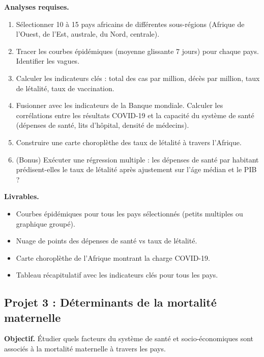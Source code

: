 \textbf{Analyses requises.}
\begin{enumerate}
  \item S\'electionner 10 \`a 15 pays africains de diff\'erentes sous-r\'egions (Afrique de l'Ouest, de l'Est, australe, du Nord, centrale).
  \item Tracer les courbes \'epid\'emiques (moyenne glissante 7 jours) pour chaque pays. Identifier les vagues.
  \item Calculer les indicateurs cl\'es : total des cas par million, d\'ec\`es par million, taux de l\'etalit\'e, taux de vaccination.
  \item Fusionner avec les indicateurs de la Banque mondiale. Calculer les corr\'elations entre les r\'esultats COVID-19 et la capacit\'e du syst\`eme de sant\'e (d\'epenses de sant\'e, lits d'h\^opital, densit\'e de m\'edecins).
  \item Construire une carte choropl\`ethe des taux de l\'etalit\'e \`a travers l'Afrique.
  \item (Bonus) Ex\'ecuter une r\'egression multiple : les d\'epenses de sant\'e par habitant pr\'edisent-elles le taux de l\'etalit\'e apr\`es ajustement sur l'\'age m\'edian et le PIB ?
\end{enumerate}

\textbf{Livrables.}
\begin{itemize}
  \item Courbes \'epid\'emiques pour tous les pays s\'electionn\'es (petits multiples ou graphique group\'e).
  \item Nuage de points des d\'epenses de sant\'e vs taux de l\'etalit\'e.
  \item Carte choropl\`ethe de l'Afrique montrant la charge COVID-19.
  \item Tableau r\'ecapitulatif avec les indicateurs cl\'es pour tous les pays.
\end{itemize}

\subsection{Projet 3 : D\'eterminants de la mortalit\'e maternelle}

\textbf{Objectif.} \'Etudier quels facteurs du syst\`eme de sant\'e et socio-\'economiques sont associ\'es \`a la mortalit\'e maternelle \`a travers les pays.

